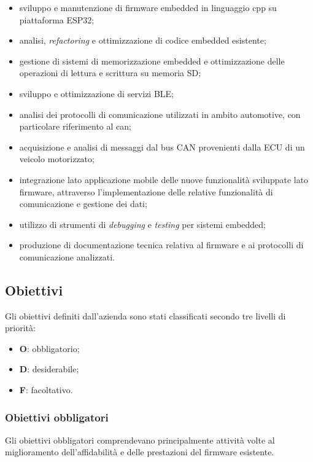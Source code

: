 \begin{itemize}
    \item sviluppo e manutenzione di firmware embedded in linguaggio \gls{cpp} su piattaforma ESP32;
    \item analisi, \textit{refactoring} e ottimizzazione di codice embedded esistente;
    \item gestione di sistemi di memorizzazione embedded e ottimizzazione delle operazioni di lettura e scrittura
    su memoria SD;
    \item sviluppo e ottimizzazione di servizi BLE;
    \item analisi dei protocolli di comunicazione utilizzati in ambito automotive, con particolare riferimento
    al \gls{can};
    \item acquisizione e analisi di messaggi dal bus CAN provenienti dalla ECU di un veicolo motorizzato;
    \item     integrazione lato applicazione mobile delle nuove funzionalità sviluppate lato firmware, attraverso 
    l’implementazione delle relative funzionalità di comunicazione e gestione dei dati;
    \item utilizzo di strumenti di \textit{debugging} e \textit{testing} per sistemi embedded;
    \item produzione di documentazione tecnica relativa al firmware e ai protocolli di comunicazione analizzati.
\end{itemize}


\subsection{Obiettivi}

Gli obiettivi definiti dall'azienda sono stati classificati secondo tre livelli di priorità:

\begin{itemize}
    \item \textbf{O}: obbligatorio;
    \item \textbf{D}: desiderabile;
    \item \textbf{F}: facoltativo.
\end{itemize}


\subsubsection{Obiettivi obbligatori}

Gli obiettivi obbligatori comprendevano principalmente attività volte al miglioramento dell'affidabilità
e delle prestazioni del firmware esistente.

